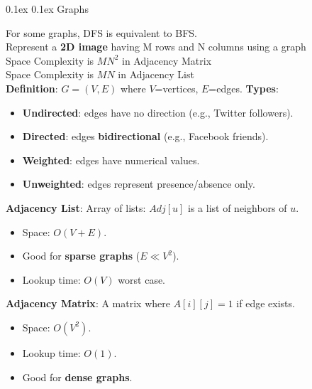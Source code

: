 \documentclass[8pt,landscape]{article}
\makeatletter
\renewcommand{\subsection}{\@startsection{subsection}{2}{0pt}%
    {0.1ex}%
    {0.1ex}%
    {\fontsize{8}{9}\bfseries\color{blue}}} %
\newcommand{\smalltext}[1]{%
  {\fontsize{8}{9}\selectfont\sloppy #1\par}%
}
\makeatother
\begin{document}
\begin{multicols}{3}
\subsection{Graphs}
\smalltext{
  For some graphs, DFS is equivalent to BFS. \\
  Represent a \textbf{2D image} having M rows and N columns using a graph \\
  Space Complexity is $MN^2$  in Adjacency Matrix\\
  Space Complexity is $MN$  in Adjacency List\\
\textbf{Definition}: $G=(V, E)$ where $V$=vertices, $E$=edges.
\textbf{Types}:
\begin{itemize}[noitemsep, nolistsep, leftmargin=1em]
    \item \textbf{Undirected}: edges have no direction (e.g., Twitter followers).
    \item \textbf{Directed}: edges \textbf{bidirectional} (e.g., Facebook friends).
    \item \textbf{Weighted}: edges have numerical values.
    \item \textbf{Unweighted}: edges represent presence/absence only.
\end{itemize}
\textbf{Adjacency List}: Array of lists: $Adj[u]$ is a list of neighbors of $u$.
\begin{itemize}[noitemsep, nolistsep, leftmargin=1em]
    \item Space: $O(V+E)$.
    \item Good for \textbf{sparse graphs} ($E \ll V^2$).
    \item Lookup time: $O(V)$ worst case.
\end{itemize}
\textbf{Adjacency Matrix}: A matrix where $A[i][j]=1$ if edge exists.
\begin{itemize}[noitemsep, nolistsep, leftmargin=1em]
    \item Space: $O(V^2)$.
    \item Lookup time: $O(1)$.
    \item Good for \textbf{dense graphs}.
\end{itemize}
}


\end{multicols}
\end{document}
